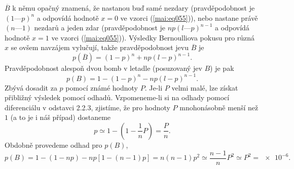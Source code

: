 \begin{example}
  \(\overline{B}\) k němu opačný znamená, že nastanou buď samé nezdary (pravděpodobnost je \((1 — p)^n\) a 
  odpovídá hodnotě \(x = 0\) ve vzorci (\ref{mai:eq055})), nebo nastane právě \((n — 1)\) nezdarů a jeden zdar 
  (pravděpodobnost je \(np(l — p)^{n-1}\) a odpovídá hodnotě \(x = 1\) ve vzorci (\ref{mai:eq055})). Výsledky 
  Bernoulliova pokusu pro různá \(x\) se ovšem navzájem vylučují, takže pravděpodobnost jevu \(\overline{B}\) 
  je
  \begin{equation*}
    p(\overline{B}) = (1 - p)^n + np(l - p)^{n-1}.
  \end{equation*}
  Pravděpodobnost alespoň dvou bomb v letadle (posuzovaný jev \(B\)) je pak
  \begin{equation*}
    p(B) = 1 - (1 - p)^n - np(l - p)^{n-1}.
  \end{equation*}
  Zbývá dosadit za \(p\) pomocí známé hodnoty \(P\). Je-li \(P\) velmi malé, lze získat přibližný výsledek 
  pomocí odhadů. Vzpomeneme-li si na odhady pomocí diferenciálu v odstavci 2.2.3, zjistíme, že pro hodnoty 
  \(P\) mnohonásobně menší než \(1\) (a to je i náš případ) dostaneme
  \begin{equation*}
    p \simeq 1 - \left(1 - \dfrac{1}{n}P\right) = \dfrac{P}{n}.
  \end{equation*}
  Obdobně provedeme odhad pro \(p(B)\),
  \begin{equation*}
    p(B) = 1 - (1 - np) - np\left[1 - (n - 1)p\right] = n(n - 1)p^2 \simeq \dfrac{n-1}{n}P^2 
         \simeq P^2 = \num{e-6}.
  \end{equation*}
\normalsize
\end{example}